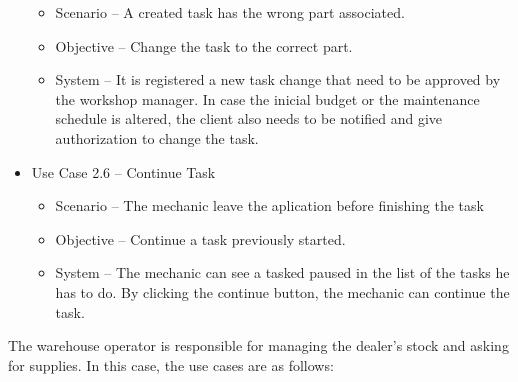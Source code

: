 \begin{itemize}
\begin{itemize}
    \item Scenario – A created task has the wrong part associated.
    \item Objective – Change the task to the correct part.
    \item System – It is registered a new task change that need to be approved by the workshop manager. In case the inicial budget or the maintenance schedule is altered, the client also needs to be notified and give authorization to change the task.
  \end{itemize}
    \item Use Case 2.6 – Continue Task
  \begin{itemize}
    \item Scenario – The mechanic leave the aplication before finishing the task
    \item Objective – Continue a task previously started.
    \item System – The mechanic can see a tasked paused in the list of the tasks he has to do. By clicking the continue button, the mechanic can continue the task.
  \end{itemize}
\end{itemize}
\hfill \break

The warehouse operator is responsible for managing the dealer's stock and asking for supplies. 
In this case, the use cases are as follows:

